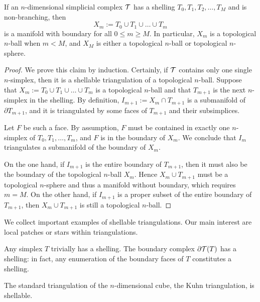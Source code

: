 \documentclass[a4paper]{article}
\begin{document}

\begin{lemma}    
    If an $n$-dimensional simplicial complex ${\mathcal T}$ has a shelling $T_{0}, T_{1}, T_{2}, \dots, T_{M}$ and is non-branching, 
    then
    $$
        X_{m} := T_{0} \cup T_{1} \cup \dots \cup T_{m}
    $$ 
    is a manifold with boundary for all $0 \leq m \geq M$.
    In particular, $X_{m}$ is a topological $n$-ball when $m < M$, 
    and 
    $X_{M}$ is either a topological $n$-ball or topological $n$-sphere. 
\end{lemma}
\begin{proof}  
    We prove this claim by induction. 
    Certainly, if ${\mathcal T}$ contains only one single $n$-simplex, then it is a shellable triangulation of a topological $n$-ball. 
    Suppose that $X_m := T_{0} \cup T_{1} \cup \dots \cup T_{m}$ is a topological $n$-ball and that $T_{m+1}$ is the next $n$-simplex in the shelling.
    By definition, $I_{m+1} := X_{m} \cap T_{m+1}$ is a submanifold of $\partial T_{m+1}$,
    and it is triangulated by some faces of $T_{m+1}$ and their subsimplices. 
    
    Let $F$ be such a face. 
    By assumption, $F$ must be contained in exactly one $n$-simplex of $T_{0}, T_{1}, \dots, T_{m}$,
    and $F$ is in the boundary of $X_{m}$. We conclude that $I_{m}$ triangulates a submanifold of the boundary of $X_{m}$.
    
    On the one hand, 
    if $I_{m+1}$ is the entire boundary of $T_{m+1}$, 
    then it must also be the boundary of the topological $n$-ball $X_{m}$. 
    Hence $X_{m} \cup T_{m+1}$ must be a topological $n$-sphere and thus a manifold without boundary, which requires $m = M$.
    On the other hand, 
    if $I_{m+1}$ is a proper subset of the entire boundary of $T_{m+1}$, 
    then $X_{m} \cup T_{m+1}$ is still a topological $n$-ball.
\end{proof}






We collect important examples of shellable triangulations.
Our main interest are local patches or stars within triangulations. 

\begin{example}
    Any simplex $T$ trivially has a shelling. The boundary complex $\partial {\mathcal T}(T)$ has a shelling:
    in fact, any enumeration of the boundary faces of $T$ constitutes a shelling.
\end{example}
\begin{example}
    The standard triangulation of the $n$-dimensional cube, the Kuhn triangulation, is shellable. 
\end{example}
\end{document}
